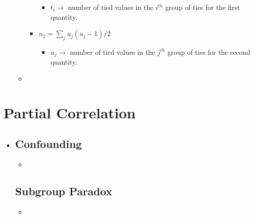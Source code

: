 \begin{itemize}
\begin{itemize}
\begin{itemize}
        \begin{itemize}
          \item \(t_i\to\) number of tied values in the \(i^{th}\) group of ties for the first quantity.
        \end{itemize}
      \item \(n_2 = \sum_{j} u_j(u_j -1)/2\)
      \begin{itemize}
        \item \(u_j\to\) number of tied values in the \(j^{th}\) group of ties for the second quantity.
      \end{itemize}
    \end{itemize}
    \item {}
  \end{itemize}
  
\end{itemize}

\section{Partial Correlation}
\begin{itemize}
  \item[]

  \subsection{Confounding}
  \begin{itemize}
    \item 
  \end{itemize}

  \subsection{Subgroup Paradox}
  \begin{itemize}
    \item 
  \end{itemize}
  
\end{itemize}
